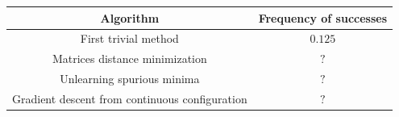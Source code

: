 \begin{tabular}{cc}
\toprule
Algorithm                                      & Frequency of successes \\ \midrule
First trivial method                           & $0.125$                \\
Matrices distance minimization                 & $?$                    \\ 
Unlearning spurious minima                     & $?$                    \\
Gradient descent from continuous configuration & $?$                    \\
\bottomrule
\end{tabular}

